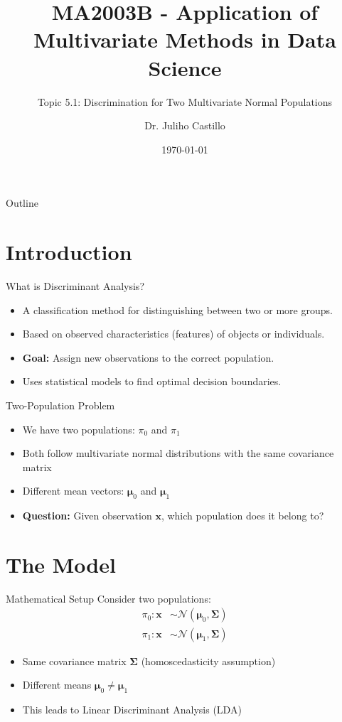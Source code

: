 \documentclass[aspectratio=169]{beamer}
\title[Two-Population Discrimination]{MA2003B - Application of Multivariate Methods in Data Science}
\subtitle{Topic 5.1: Discrimination for Two Multivariate Normal Populations}
\author{Dr. Juliho Castillo}
\institute{Tec de Monterrey}
\date{\today}
\begin{document}
\begin{frame}
  \titlepage
\end{frame}

\begin{frame}{Outline}
  \tableofcontents
\end{frame}

\section{Introduction}
\begin{frame}{What is Discriminant Analysis?}
  \begin{itemize}
    \item A classification method for distinguishing between two or more groups.
    \item Based on observed characteristics (features) of objects or individuals.
    \item \textbf{Goal:} Assign new observations to the correct population.
    \item Uses statistical models to find optimal decision boundaries.
  \end{itemize}
\end{frame}

\begin{frame}{Two-Population Problem}
  \begin{itemize}
    \item We have two populations: $\pi_0$ and $\pi_1$
    \item Both follow multivariate normal distributions with the same covariance matrix
    \item Different mean vectors: $\boldsymbol{\mu}_0$ and $\boldsymbol{\mu}_1$
    \item \textbf{Question:} Given observation $\mathbf{x}$, which population does it belong to?
  \end{itemize}
\end{frame}

\section{The Model}
\begin{frame}{Mathematical Setup}
  Consider two populations:
  \begin{align}
  \pi_0: \mathbf{x} &\sim \mathcal{N}(\boldsymbol{\mu}_0, \boldsymbol{\Sigma}) \\
  \pi_1: \mathbf{x} &\sim \mathcal{N}(\boldsymbol{\mu}_1, \boldsymbol{\Sigma})
  \end{align}
  \begin{itemize}
    \item Same covariance matrix $\boldsymbol{\Sigma}$ (homoscedasticity assumption)
    \item Different means $\boldsymbol{\mu}_0 \neq \boldsymbol{\mu}_1$
    \item This leads to Linear Discriminant Analysis (LDA)
  \end{itemize}
\end{frame}
\end{document}
